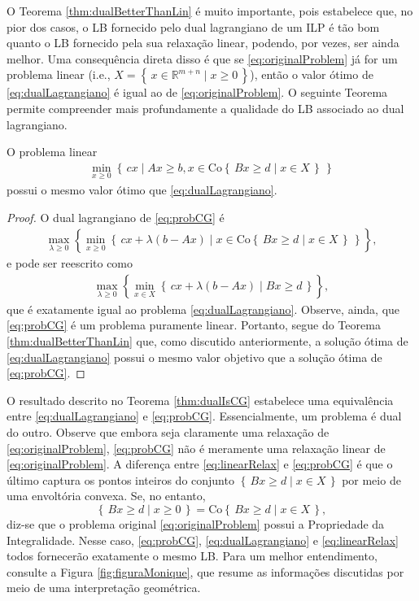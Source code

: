 {O Teorema \ref{thm:dualBetterThanLin} é muito importante, pois estabelece que, no pior dos casos, o LB fornecido pelo dual lagrangiano de um ILP é tão bom quanto o LB fornecido pela sua relaxação linear, podendo, por vezes, ser ainda melhor. Uma consequência direta disso é que se \eqref{eq:originalProblem} já for um problema linear (i.e., $X = \left\{ \, x \in \mathbb{R}^{m+n} \mid  x\geq 0 \,\right\}$), então o valor ótimo de \eqref{eq:dualLagrangiano} é igual ao de \eqref{eq:originalProblem}.	O seguinte Teorema permite compreender mais profundamente a qualidade do LB associado ao dual lagrangiano.

\begin{theorem}
	\label{thm:dualIsCG}
	O problema linear 
\begin{align*}
	\min_{x\geq 0} \left\{ \, cx \mid Ax \geq b, x \in \text{Co}\left\{\, Bx \geq d \mid x \in X\,\right\}\, \right\} \tag{CG}\label{eq:probCG}
\end{align*}
possui o mesmo valor ótimo que \eqref{eq:dualLagrangiano}.
\end{theorem}
\begin{proof}
	O dual lagrangiano de \eqref{eq:probCG} é
\begin{align*}
	\max_{\lambda \geq 0} \left\{\min_{x\geq 0} \left\{ \, cx + \lambda(b - Ax) \mid x \in \text{Co}\left\{\, Bx \geq d \mid x \in X\,\right\}\, \right\} \right\},
\end{align*}
e pode ser reescrito como
\begin{align*}
	\max_{\lambda \geq 0} \left\{\min_{x \in X} \left\{ \, cx + \lambda(b - Ax) \mid Bx \geq d \, \right\} \right\}, 
\end{align*}
que é exatamente igual ao problema \eqref{eq:dualLagrangiano}. Observe, ainda, que \eqref{eq:probCG} é um problema puramente linear. Portanto, segue do Teorema \ref{thm:dualBetterThanLin} que, como discutido anteriormente, a solução ótima de \eqref{eq:dualLagrangiano} possui o mesmo valor objetivo que a solução ótima de \eqref{eq:probCG}.
\end{proof}

O resultado descrito no Teorema \ref{thm:dualIsCG} estabelece uma equivalência entre \eqref{eq:dualLagrangiano} e \eqref{eq:probCG}. Essencialmente, um problema é dual do outro. Observe que  embora seja claramente uma relaxação de \eqref{eq:originalProblem},  \eqref{eq:probCG} não é meramente uma relaxação linear de \eqref{eq:originalProblem}. A diferença entre \eqref{eq:linearRelax} e \eqref{eq:probCG} é que o último captura os pontos inteiros do conjunto $\left\{\, Bx \geq d \mid x \in X \,\right\}$ por meio de uma envoltória convexa. Se, no entanto,  \[\left\{ \, Bx \geq d \mid x \geq 0 \,\right\} = \text{Co}\left\{\, Bx \geq d \mid x \in X \,\right\},\] diz-se que o problema original \eqref{eq:originalProblem} possui a Propriedade da Integralidade. Nesse caso, \eqref{eq:probCG}, \eqref{eq:dualLagrangiano} e \eqref{eq:linearRelax} todos fornecerão exatamente o mesmo LB. Para um melhor entendimento, consulte a Figura \ref{fig:figuraMonique}, que resume as informações discutidas por meio de uma interpretação geométrica.

}
